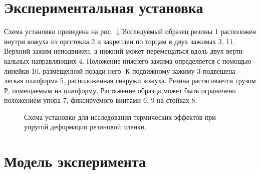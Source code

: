 \documentclass[a4paper,12pt]{article} %
\begin{document}
\section{Экспериментальная установка}
	Схема установки приведена на рис.~\ref{ris:ustanovka} Исследуемый образец резины 1 расположен внутри кожуха из оргстекла 2 и закреплен по торцам в двух зажимах 3, 11. Верхний зажим неподвижен, а нижний может перемещаться вдоль двух верти- кальных направляющих 4. Положение нижнего зажима определяется с помощью линейки 10, размещенной позади него. К подвижному зажиму 3 подвешена легкая платформа 5, расположенная снаружи кожуха. Резина растягивается грузом Р, помещаемым на платформу. Растяжение образца может быть ограничено положением упора 7, фиксируемого винтами 6, 9 на стойках 8.	
	\begin{figure}[H]
		\caption{Схема установки для исследования термических эффектов при упругой деформации резиновой пленки.}
		\label{ris:ustanovka}
	\end{figure}

\section{Модель эксперимента}
\end{document}
